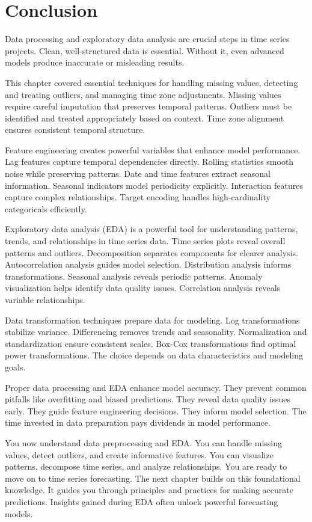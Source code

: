 \section{Conclusion}

Data processing and exploratory data analysis are crucial steps in time series projects. Clean, well-structured data is essential. Without it, even advanced models produce inaccurate or misleading results.

This chapter covered essential techniques for handling missing values, detecting and treating outliers, and managing time zone adjustments. Missing values require careful imputation that preserves temporal patterns. Outliers must be identified and treated appropriately based on context. Time zone alignment ensures consistent temporal structure.

Feature engineering creates powerful variables that enhance model performance. Lag features capture temporal dependencies directly. Rolling statistics smooth noise while preserving patterns. Date and time features extract seasonal information. Seasonal indicators model periodicity explicitly. Interaction features capture complex relationships. Target encoding handles high-cardinality categoricals efficiently.

Exploratory data analysis (EDA) is a powerful tool for understanding patterns, trends, and relationships in time series data. Time series plots reveal overall patterns and outliers. Decomposition separates components for clearer analysis. Autocorrelation analysis guides model selection. Distribution analysis informs transformations. Seasonal analysis reveals periodic patterns. Anomaly visualization helps identify data quality issues. Correlation analysis reveals variable relationships.

Data transformation techniques prepare data for modeling. Log transformations stabilize variance. Differencing removes trends and seasonality. Normalization and standardization ensure consistent scales. Box-Cox transformations find optimal power transformations. The choice depends on data characteristics and modeling goals.

Proper data processing and EDA enhance model accuracy. They prevent common pitfalls like overfitting and biased predictions. They reveal data quality issues early. They guide feature engineering decisions. They inform model selection. The time invested in data preparation pays dividends in model performance.

You now understand data preprocessing and EDA. You can handle missing values, detect outliers, and create informative features. You can visualize patterns, decompose time series, and analyze relationships. You are ready to move on to time series forecasting. The next chapter builds on this foundational knowledge. It guides you through principles and practices for making accurate predictions. Insights gained during EDA often unlock powerful forecasting models.

